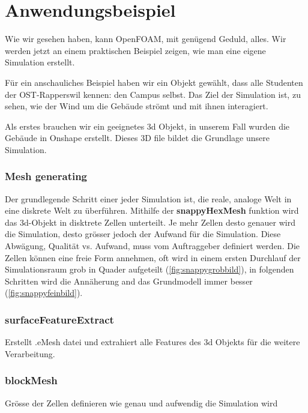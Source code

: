 %
%
%
%
\section{Anwendungsbeispiel
\label{openfoam:section:Anwendungsbeispiel}}
Wie wir gesehen haben, kann OpenFOAM, mit genügend Geduld, alles. 
Wir werden jetzt an einem praktischen Beispiel zeigen, wie man eine eigene Simulation erstellt.

Für ein anschauliches Beispiel haben wir ein Objekt gewählt, dass alle Studenten der OST-Rapperswil kennen: den Campus selbst.
Das Ziel der Simulation ist, zu sehen, wie der Wind um die Gebäude strömt und mit ihnen interagiert.

Als erstes brauchen wir ein geeignetes 3d Objekt, in unserem Fall wurden die Gebäude in Onshape erstellt.
Dieses 3D file bildet die Grundlage unsere Simulation.

\subsubsection{Mesh generating\label{openfoam:section:Mesh generating}}
Der grundlegende Schritt einer jeder Simulation ist, die reale, analoge Welt in eine diskrete Welt zu überführen.
Mithilfe der \textbf{snappyHexMesh} funktion wird das 3d-Objekt in disktrete Zellen unterteilt. Je mehr Zellen desto genauer
wird die Simulation, desto grösser jedoch der Aufwand für die Simulation. Diese Abwägung, Qualität vs. Aufwand, muss vom Auftraggeber definiert werden.
Die Zellen können eine freie Form annehmen, oft wird in einem ersten Durchlauf der Simulationsraum grob in Quader aufgeteilt (\ref{fig:snappygrobbild}),
in folgenden Schritten wird die Annäherung and das Grundmodell immer besser (\ref{fig:snappyfeinbild}).
\subsubsection{surfaceFeatureExtract\label{openfoam:section:surfaceFeatureExtract}}
Erstellt .eMesh datei und extrahiert alle Features des 3d Objekts für die weitere Verarbeitung.

\subsubsection{blockMesh\label{openfoam:section:blockMesh}}
Grösse der Zellen definieren wie genau und aufwendig die Simulation wird


